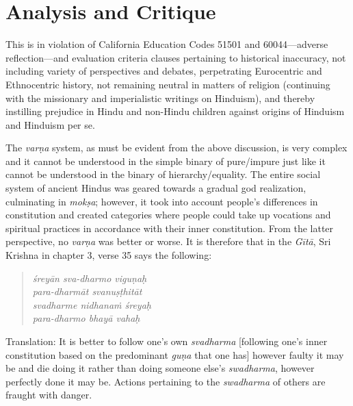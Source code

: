 \section*{Analysis and Critique} 

This is in violation of California Education Codes 51501 and 60044—adverse reflection—and evaluation criteria clauses pertaining to historical inaccuracy, not including variety of perspectives and debates, perpetrating Eurocentric and Ethnocentric history, not remaining neutral in matters of religion (continuing with the missionary and imperialistic writings on Hinduism), and thereby instilling prejudice in Hindu and non-Hindu children against origins of Hinduism and Hinduism per se.

The \textit{varṇa} system, as must be evident from the above discussion, is very complex and it cannot be understood in the simple binary of pure/impure just like it cannot be understood in the binary of hierarchy/equality. The entire social system of ancient Hindus was geared towards a gradual god realization, culminating in \textit{mokṣa}; however, it took into account people’s differences in constitution and created categories where people could take up vocations and spiritual practices in accordance with their inner constitution. From the latter perspective, no \textit{varṇa} was better or worse. It is therefore that in the \textit{Gītā}, Sri Krishna in chapter 3, verse 35 says the following: 

\begin{quote}
\textit{śreyān sva-dharmo viguṇaḥ}\\
\textit{para-dharmāt svanuṣṭhitāt}\\
\textit{svadharme nidhanaṁ śreyaḥ}\\
\textit{para-dharmo bhayā vahaḥ}
\end{quote}
Translation: It is better to follow one’s own \textit{svadharma}  [following one’s inner constitution based on the predominant \textit{guṇa} that one has] however faulty it may be and die doing it rather than doing someone else’s \textit{swadharma}, however perfectly done it may be. Actions pertaining to the \textit{swadharma} of others are fraught with danger. 

